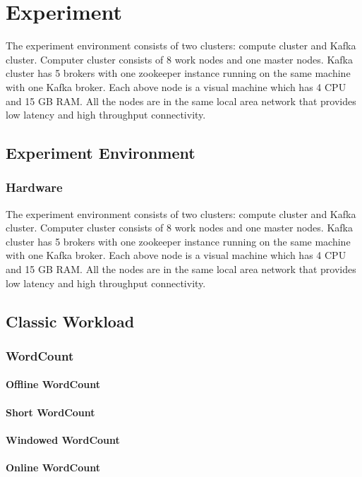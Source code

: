 \chapter{Experiment}
\label{chapter:experiment}
The experiment environment consists of two clusters: compute cluster and Kafka cluster. Computer cluster consists of 8 work nodes and one master nodes. Kafka cluster has 5 brokers with one zookeeper instance running on the same machine with one Kafka broker. Each above node is a visual machine which has 4 CPU and 15 GB RAM. All the nodes are in the same local area network that provides low latency and high throughput connectivity. 

\section{Experiment Environment}
\label{sec:triton}
\subsection{Hardware}

The experiment environment consists of two clusters: compute cluster and Kafka cluster. Computer cluster consists of 8 work nodes and one master nodes. Kafka cluster has 5 brokers with one zookeeper instance running on the same machine with one Kafka broker. Each above node is a visual machine which has 4 CPU and 15 GB RAM. All the nodes are in the same local area network that provides low latency and high throughput connectivity. 


\section{Classic Workload}
\subsection{WordCount}
\subsubsection{Offline WordCount}
\subsubsection{Short WordCount}
\subsubsection{Windowed WordCount}
\subsubsection{Online WordCount}

